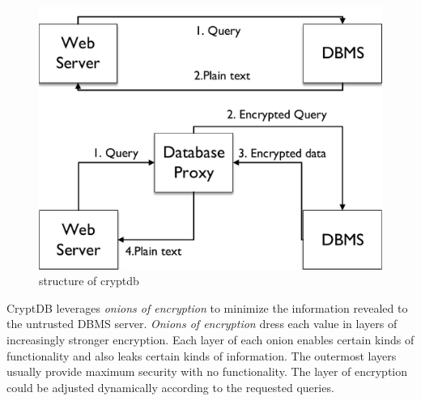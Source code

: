 \begin{figure}[tb]
\centering
\includegraphics[width=\columnwidth]{images/Cryptdb-structure.pdf}
\caption{structure of cryptdb}
\label{fig:stack1}
\end{figure}



CryptDB leverages \emph{onions of encryption} to minimize the information revealed to the untrusted DBMS server. 
\emph{Onions of encryption} dress each value in layers of increasingly stronger encryption. 
Each layer of each onion enables certain kinds of functionality and also leaks certain kinds of information.
The outermost layers usually provide maximum security with no functionality.
The layer of encryption could be adjusted dynamically according to the requested queries. 

